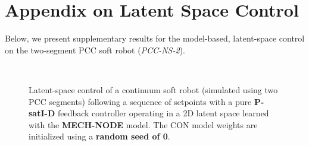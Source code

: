 \section{Appendix on Latent Space Control}\label{sec:apx-con:latent_space_control}
Below, we present supplementary results for the model-based, latent-space control on the two-segment \gls{PCC} soft robot (\emph{PCC-NS-2}).

\begin{figure}[ht]
    \centering
    \\
    \caption{Latent-space control of a continuum soft robot (simulated using two \gls{PCC} segments) following a sequence of setpoints with a pure \textbf{P-satI-D} feedback controller operating in a 2D latent space learned with the \textbf{MECH-NODE} model. The \gls{CON} model weights are initialized using a \textbf{random seed of 0}.
}
\end{figure}
